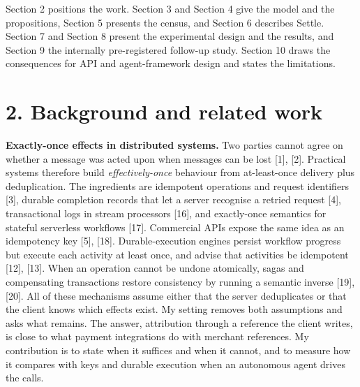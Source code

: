 \documentclass[
  10pt,
]{article}
\begin{document}
Section 2 positions the work. Section 3 and Section 4 give the model and
the propositions, Section 5 presents the census, and Section 6 describes
Settle. Section 7 and Section 8 present the experimental design and the
results, and Section 9 the internally pre-registered follow-up study.
Section 10 draws the consequences for API and agent-framework design and
states the limitations.

\hypertarget{background-and-related-work}{%
\section*{2. Background and related
work}\label{background-and-related-work}}

\textbf{Exactly-once effects in distributed systems.} Two parties cannot
agree on whether a message was acted upon when messages can be lost
{[}1{]}, {[}2{]}. Practical systems therefore build
\emph{effectively-once} behaviour from at-least-once delivery plus
deduplication. The ingredients are idempotent operations and request
identifiers {[}3{]}, durable completion records that let a server
recognise a retried request {[}4{]}, transactional logs in stream
processors {[}16{]}, and exactly-once semantics for stateful serverless
workflows {[}17{]}. Commercial APIs expose the same idea as an
idempotency key {[}5{]}, {[}18{]}. Durable-execution engines persist
workflow progress but execute each activity at least once, and advise
that activities be idempotent {[}12{]}, {[}13{]}. When an operation
cannot be undone atomically, sagas and compensating transactions restore
consistency by running a semantic inverse {[}19{]}, {[}20{]}. All of
these mechanisms assume either that the server deduplicates or that the
client knows which effects exist. My setting removes both assumptions
and asks what remains. The answer, attribution through a reference the
client writes, is close to what payment integrations do with merchant
references. My contribution is to state when it suffices and when it
cannot, and to measure how it compares with keys and durable execution
when an autonomous agent drives the calls.
\end{document}
